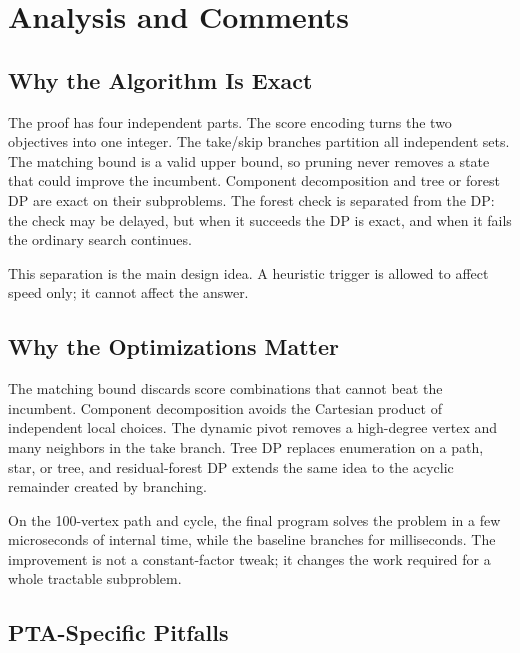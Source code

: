 \documentclass[12pt,a4paper]{report}
\begin{document}
\chapter{Analysis and Comments}\label{ch:analysis}

\section{Why the Algorithm Is Exact}

The proof has four independent parts.  The score encoding turns the two
objectives into one integer.  The take/skip branches partition all independent
sets.  The matching bound is a valid upper bound, so pruning never removes a
state that could improve the incumbent.  Component decomposition and tree or
forest DP are exact on their subproblems.  The forest check is separated from
the DP: the check may be delayed, but when it succeeds the DP is exact, and when
it fails the ordinary search continues.

This separation is the main design idea.  A heuristic trigger is allowed to
affect speed only; it cannot affect the answer.

\section{Why the Optimizations Matter}

The matching bound discards score combinations that cannot beat the incumbent.
Component decomposition avoids the Cartesian product of independent local
choices.  The dynamic pivot removes a high-degree vertex and many neighbors in
the take branch.  Tree DP replaces enumeration on a path, star, or tree, and
residual-forest DP extends the same idea to the acyclic remainder created by
branching.

On the 100-vertex path and cycle, the final program solves the problem in a few
microseconds of internal time, while the baseline branches for milliseconds.
The improvement is not a constant-factor tweak; it changes the work required
for a whole tractable subproblem.

\section{PTA-Specific Pitfalls}
\end{document}
